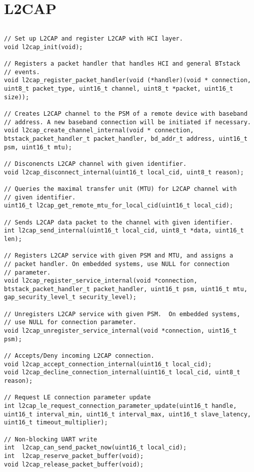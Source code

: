 \section{L2CAP}
\label{appendix:api_l2cap}
$ $
\begin{lstlisting}
// Set up L2CAP and register L2CAP with HCI layer.
void l2cap_init(void);

// Registers a packet handler that handles HCI and general BTstack 
// events.
void l2cap_register_packet_handler(void (*handler)(void * connection, uint8_t packet_type, uint16_t channel, uint8_t *packet, uint16_t size));

// Creates L2CAP channel to the PSM of a remote device with baseband 
// address. A new baseband connection will be initiated if necessary.
void l2cap_create_channel_internal(void * connection, btstack_packet_handler_t packet_handler, bd_addr_t address, uint16_t psm, uint16_t mtu);

// Disconencts L2CAP channel with given identifier. 
void l2cap_disconnect_internal(uint16_t local_cid, uint8_t reason);

// Queries the maximal transfer unit (MTU) for L2CAP channel with 
// given identifier. 
uint16_t l2cap_get_remote_mtu_for_local_cid(uint16_t local_cid);

// Sends L2CAP data packet to the channel with given identifier.
int l2cap_send_internal(uint16_t local_cid, uint8_t *data, uint16_t len);

// Registers L2CAP service with given PSM and MTU, and assigns a 
// packet handler. On embedded systems, use NULL for connection
// parameter.
void l2cap_register_service_internal(void *connection, btstack_packet_handler_t packet_handler, uint16_t psm, uint16_t mtu, gap_security_level_t security_level);

// Unregisters L2CAP service with given PSM.  On embedded systems, 
// use NULL for connection parameter.
void l2cap_unregister_service_internal(void *connection, uint16_t psm);

// Accepts/Deny incoming L2CAP connection.
void l2cap_accept_connection_internal(uint16_t local_cid);
void l2cap_decline_connection_internal(uint16_t local_cid, uint8_t reason);

// Request LE connection parameter update
int l2cap_le_request_connection_parameter_update(uint16_t handle, uint16_t interval_min, uint16_t interval_max, uint16_t slave_latency, uint16_t timeout_multiplier);

// Non-blocking UART write
int  l2cap_can_send_packet_now(uint16_t local_cid);    
int  l2cap_reserve_packet_buffer(void);
void l2cap_release_packet_buffer(void);


\end{lstlisting}
